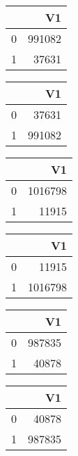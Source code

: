 \bigskip\bigskip
\centering
\begin{tabular}{rr}
  \hline
 & V1 \\ 
  \hline
0 & 991082 \\ 
  1 & 37631 \\ 
   \hline
\end{tabular}

\bigskip\bigskip
\centering
\begin{tabular}{rr}
  \hline
 & V1 \\ 
  \hline
0 & 37631 \\ 
  1 & 991082 \\ 
   \hline
\end{tabular}

\bigskip\bigskip
\centering
\begin{tabular}{rr}
  \hline
 & V1 \\ 
  \hline
0 & 1016798 \\ 
  1 & 11915 \\ 
   \hline
\end{tabular}

\bigskip\bigskip
\centering
\begin{tabular}{rr}
  \hline
 & V1 \\ 
  \hline
0 & 11915 \\ 
  1 & 1016798 \\ 
   \hline
\end{tabular}

\bigskip\bigskip
\centering
\begin{tabular}{rr}
  \hline
 & V1 \\ 
  \hline
0 & 987835 \\ 
  1 & 40878 \\ 
   \hline
\end{tabular}

\bigskip\bigskip
\centering
\begin{tabular}{rr}
  \hline
 & V1 \\ 
  \hline
0 & 40878 \\ 
  1 & 987835 \\ 
   \hline
\end{tabular}


